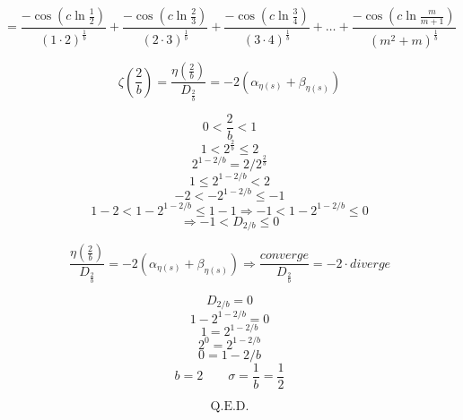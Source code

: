 \documentclass{amsart}
\begin{document}
	\[ = \frac{-\cos(c \ln \frac{1}{2})}{(1{\cdot}2)^{\frac{1}{b}}} + \frac{-\cos(c \ln \frac{2}{3})}{(2{\cdot}3)^{\frac{1}{b}}} + \frac{-\cos(c \ln \frac{3}{4})}{(3{\cdot}4)^{\frac{1}{b}}} + \dots + \frac{-\cos(c \ln \frac{m}{m+1})}{(m^2+m)^{\frac{1}{b}}} \]
	
	
	
	
	\[ \zeta(\frac{2}{b}) = \frac{\eta( \frac{2}{b} )}{D_{\frac{2}{b}}} = - 2(\alpha_{\eta(s)} + \beta_{\eta(s)}) \]
	
	\[ 0 < \frac{2}{b} < 1 \]
	\[ 1 < 2^{\frac{2}{b}} \leq 2 \]
	\[ 2^{1-2/b} = 2 / 2^{\frac{2}{b}} \]
	\[ 1 \leq 2^{1-2/b} < 2 \]
	\[ -2 < -2^{1-2/b} \leq -1 \]
	\[ 1-2 < 1-2^{1-2/b} \leq 1-1 \Rightarrow -1 < 1-2^{1-2/b} \leq 0  \] 
	\[\Rightarrow -1 < D_{2/b} \leq 0  \] 
	
	\[ \frac{\eta( \frac{2}{b} )}{D_{\frac{2}{b}}} = - 2(\alpha_{\eta(s)} + \beta_{\eta(s)}) \Rightarrow \frac{converge}{D_{\frac{2}{b}}} = - 2 \cdot diverge \]
	
	\[ D_{2/b} = 0 \]
	\[ 1-2^{1-2/b} = 0 \]
	\[ 1 = 2^{1-2/b} \]
	\[ 2^0 = 2^{1-2/b} \]
	\[ 0 = 1-2/b \]
	\[ b=2 \qquad \sigma = \frac{1}{b} = \frac{1}{2} \]
	
	\[ \text{Q.E.D.} \]
	
	
	
	
\end{document}
